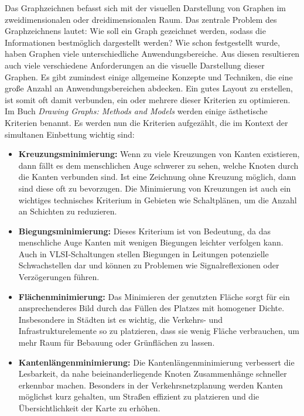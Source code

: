 \documentclass[bachelor, german]{algothesis}
\begin{document}
Das Graphzeichnen befasst sich mit der visuellen Darstellung von Graphen im zweidimensionalen oder dreidimensionalen Raum. Das zentrale Problem des Graphzeichnens lautet: Wie soll ein Graph gezeichnet werden, sodass die Informationen bestmöglich dargestellt werden? Wie schon festgestellt wurde, haben Graphen viele unterschiedliche Anwendungsbereiche. Aus diesen resultieren auch viele verschiedene Anforderungen an die visuelle Darstellung dieser Graphen.\newline
Es gibt zumindest einige allgemeine Konzepte und Techniken, die eine große Anzahl an Anwendungsbereichen abdecken. Ein gutes Layout zu erstellen, ist somit oft damit verbunden, ein oder mehrere dieser Kriterien zu optimieren. Im Buch \textit{Drawing Graphs: Methods and Models} \cite{DrawingMeth} werden einige ästhetische Kriterien benannt. Es werden nun die Kriterien aufgezählt, die im Kontext der simultanen Einbettung wichtig sind: 
\begin{itemize}
    \item  \textbf{Kreuzungsminimierung:} Wenn zu viele Kreuzungen von Kanten existieren, dann fällt es dem menschlichen Auge schwerer zu sehen, welche Knoten durch die Kanten verbunden sind. Ist eine Zeichnung ohne Kreuzung möglich, dann sind diese oft zu bevorzugen. Die Minimierung von Kreuzungen ist auch ein wichtiges technisches Kriterium in Gebieten wie Schaltplänen, um die Anzahl an Schichten zu reduzieren.
    \item  \textbf{Biegungsminimierung:} Dieses Kriterium ist von Bedeutung, da das menschliche Auge Kanten mit wenigen Biegungen leichter verfolgen kann. Auch in VLSI-Schaltungen stellen Biegungen in Leitungen potenzielle Schwachstellen dar und können zu Problemen wie Signalreflexionen oder Verzögerungen führen.
    \item  \textbf{Flächenminimierung:} Das Minimieren der genutzten Fläche sorgt für ein ansprechenderes Bild durch das Füllen des Platzes mit homogener Dichte. Insbesondere in Städten ist es wichtig, die Verkehrs- und Infrastrukturelemente so zu platzieren, dass sie wenig Fläche verbrauchen, um mehr Raum für Bebauung oder Grünflächen zu lassen.
    \item  \textbf{Kantenlängenminimierung:} Die Kantenlängenminimierung verbessert die Lesbarkeit, da nahe beieinanderliegende Knoten Zusammenhänge schneller erkennbar machen. Besonders in der Verkehrsnetzplanung werden Kanten möglichst kurz gehalten, um Straßen effizient zu platzieren und die Übersichtlichkeit der Karte zu erhöhen.
\end{itemize}
\end{document}
